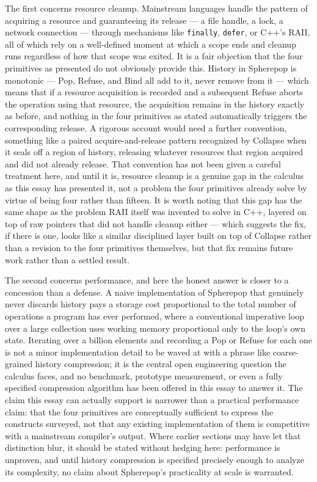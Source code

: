 \documentclass[11pt]{article}
\begin{document}
The first concerns resource cleanup. Mainstream languages handle the pattern of acquiring a resource and guaranteeing its release --- a file handle, a lock, a network connection --- through mechanisms like \texttt{finally}, \texttt{defer}, or C++'s RAII, all of which rely on a well-defined moment at which a scope ends and cleanup runs regardless of how that scope was exited. It is a fair objection that the four primitives as presented do not obviously provide this. History in Spherepop is monotonic --- Pop, Refuse, and Bind all add to it, never remove from it --- which means that if a resource acquisition is recorded and a subsequent Refuse aborts the operation using that resource, the acquisition remains in the history exactly as before, and nothing in the four primitives as stated automatically triggers the corresponding release. A rigorous account would need a further convention, something like a paired acquire-and-release pattern recognized by Collapse when it seals off a region of history, releasing whatever resources that region acquired and did not already release. That convention has not been given a careful treatment here, and until it is, resource cleanup is a genuine gap in the calculus as this essay has presented it, not a problem the four primitives already solve by virtue of being four rather than fifteen. It is worth noting that this gap has the same shape as the problem RAII itself was invented to solve in C++, layered on top of raw pointers that did not handle cleanup either --- which suggests the fix, if there is one, looks like a similar disciplined layer built on top of Collapse rather than a revision to the four primitives themselves, but that fix remains future work rather than a settled result.

The second concerns performance, and here the honest answer is closer to a concession than a defense. A naive implementation of Spherepop that genuinely never discards history pays a storage cost proportional to the total number of operations a program has ever performed, where a conventional imperative loop over a large collection uses working memory proportional only to the loop's own state. Iterating over a billion elements and recording a Pop or Refuse for each one is not a minor implementation detail to be waved at with a phrase like coarse-grained history compression; it is the central open engineering question the calculus faces, and no benchmark, prototype measurement, or even a fully specified compression algorithm has been offered in this essay to answer it. The claim this essay can actually support is narrower than a practical performance claim: that the four primitives are conceptually sufficient to express the constructs surveyed, not that any existing implementation of them is competitive with a mainstream compiler's output. Where earlier sections may have let that distinction blur, it should be stated without hedging here: performance is unproven, and until history compression is specified precisely enough to analyze its complexity, no claim about Spherepop's practicality at scale is warranted.
\end{document}
